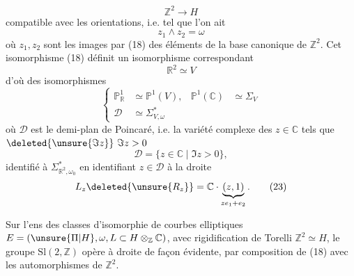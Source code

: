 \begin{equation}
\mathbb Z^2\longrightarrow H
\tag{18}
\end{equation}
compatible avec les orientations, i.e. tel que l'on ait
\begin{equation}
z_1\wedge z_2=\omega
\tag{19}
\end{equation}
où $z_1,z_2$ sont les images par (18) des éléments de la base canonique de $\mathbb Z^2$. Cet isomorphisme (18) définit un isomorphisme correspondant
\begin{equation}
\mathbb R^2\simeq V
\tag{20}
\end{equation}
d'où des isomorphismes
\begin{equation}
\left\{
\begin{aligned}
\mathbb P_{\mathbb R}^1&\simeq\mathbb P^1(V),&
\mathbb P^1(\mathbb C)&\simeq\Sigma_V\\
\mathcal D&\simeq\Sigma_{V,\omega}^*
\end{aligned}
\right.
\tag{21}
\end{equation}
où $\mathcal D$ est le demi-plan de Poincaré, i.e.  la variété complexe des $z\in\mathbb C$ tels que $\deleted{\unsure{\Im z}}\ \Im z>0$
\begin{equation}
\mathcal D=\{z\in\mathbb C\mid\Im z>0\},
\tag{22}
\end{equation}
identifié à $\Sigma_{\mathbb R^2,\omega_0}^*$ en identifiant $z\in\mathcal D$ à la droite
\begin{equation}
L_z\deleted{\unsure{R_z}}=\mathbb C\cdot\underbrace{(z,1)}_{ze_1+e_2}.
\tag{23}
\end{equation}



Sur l'ens des classes d'isomorphie de courbes elliptiques $E=(\unsure{\Pi|H},\omega,L\subset H\otimes_{\mathbb Z}\mathbb C)$, avec rigidification de Torelli $\mathbb Z^2\simeq H$, le groupe $\mathrm{Sl}(2,\mathbb Z)$ opère à droite de façon évidente, par composition  de (18) avec les automorphismes de $\mathbb Z^2$. 
